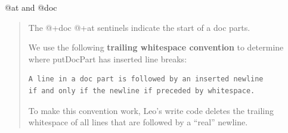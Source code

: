 \documentclass[a4paper,10pt,english]{sphinxmanual}
\begin{document}
@at and @doc
\begin{quote}

The @+doc @+at sentinels indicate the start of a doc parts.

We use the following \textbf{trailing whitespace convention} to
determine where putDocPart has inserted line breaks:

\begin{Verbatim}[commandchars=\\\{\}]
A line in a doc part is followed by an inserted newline
if and only if the newline if preceded by whitespace.
\end{Verbatim}

To make this convention work, Leo's write code deletes the trailing
whitespace of all lines that are followed by a ``real'' newline.
\end{quote}
\end{document}
